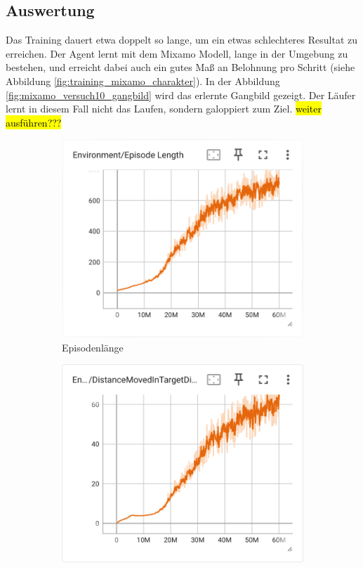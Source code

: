 \subsection{Auswertung}
Das Training dauert etwa doppelt so lange, um ein etwas schlechteres Resultat zu erreichen. Der Agent lernt mit dem Mixamo Modell, lange in der Umgebung zu bestehen, und erreicht dabei auch ein gutes Maß an Belohnung pro Schritt (siehe Abbildung \ref{fig:training_mixamo_charakter}). In der Abbildung \ref{fig:mixamo_versuch10_gangbild} wird das erlernte Gangbild gezeigt. Der Läufer lernt in diesem Fall nicht das Laufen, sondern galoppiert zum Ziel. \hl{weiter ausführen???}

\begin{figure}[H]
  \centering  
    \begin{subfigure}{.49\textwidth}
      \centering  
      \includegraphics[width=\textwidth]{img/106_episode_length}
      \caption{Episodenlänge}
      \label{fig:106_episode_length}
    \end{subfigure}
    \begin{subfigure}{.49\textwidth}
      \centering  
      \includegraphics[width=\textwidth]{img/106_move_target_dir}

\end{subfigure}
\end{figure}
